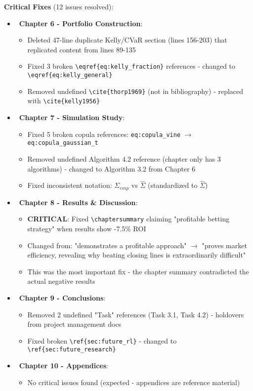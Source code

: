 \textbf{Critical Fixes} (12 issues resolved):
\begin{itemize}
  \item \done\ \textbf{Chapter 6 - Portfolio Construction}:
  \begin{itemize}
    \item Deleted 47-line duplicate Kelly/CVaR section (lines 156-203) that replicated content from lines 89-135
    \item Fixed 3 broken \texttt{\textbackslash eqref\{eq:kelly\_fraction\}} references - changed to \texttt{\textbackslash eqref\{eq:kelly\_general\}}
    \item Removed undefined \texttt{\textbackslash cite\{thorp1969\}} (not in bibliography) - replaced with \texttt{\textbackslash cite\{kelly1956\}}
  \end{itemize}
  \item \done\ \textbf{Chapter 7 - Simulation Study}:
  \begin{itemize}
    \item Fixed 5 broken copula references: \texttt{eq:copula\_vine} $\to$ \texttt{eq:copula\_gaussian\_t}
    \item Removed undefined Algorithm 4.2 reference (chapter only has 3 algorithms) - changed to Algorithm 3.2 from Chapter 6
    \item Fixed inconsistent notation: $\Sigma_{emp}$ vs $\hat{\Sigma}$ (standardized to $\hat{\Sigma}$)
  \end{itemize}
  \item \done\ \textbf{Chapter 8 - Results \& Discussion}:
  \begin{itemize}
    \item \textbf{CRITICAL}: Fixed \texttt{\textbackslash chaptersummary} claiming "profitable betting strategy" when results show -7.5\% ROI
    \item Changed from: "demonstrates a profitable approach" $\to$ "proves market efficiency, revealing why beating closing lines is extraordinarily difficult"
    \item This was the most important fix - the chapter summary contradicted the actual negative results
  \end{itemize}
  \item \done\ \textbf{Chapter 9 - Conclusions}:
  \begin{itemize}
    \item Removed 2 undefined "Task" references (Task 3.1, Task 4.2) - holdovers from project management docs
    \item Fixed broken \texttt{\textbackslash ref\{sec:future\_rl\}} - changed to \texttt{\textbackslash ref\{sec:future\_research\}}
  \end{itemize}
  \item \done\ \textbf{Chapter 10 - Appendices}:
  \begin{itemize}
    \item No critical issues found (expected - appendices are reference material)
  \end{itemize}
\end{itemize}

